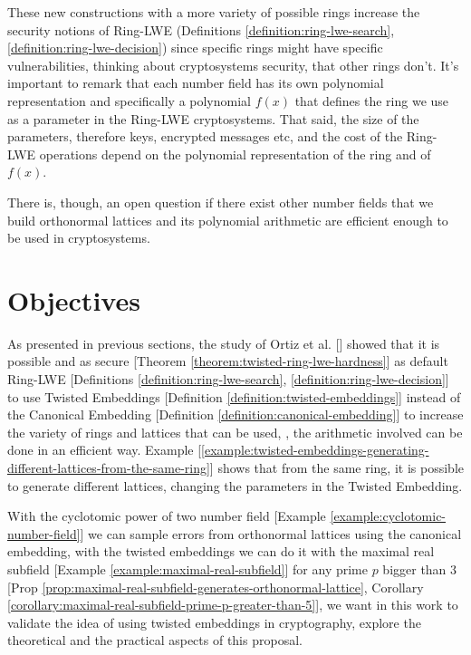 \documentclass[a4paper,12pt]{article}
\begin{document}
These new constructions with a more variety of possible rings increase the security notions of Ring-LWE (Definitions \ref{definition:ring-lwe-search}, \ref{definition:ring-lwe-decision}) since specific rings might have specific vulnerabilities, thinking about cryptosystems security, that other rings don't. It's important to remark that each number field has its own polynomial representation and specifically a polynomial \(f(x)\) that defines the ring we use as a parameter in the Ring-LWE cryptosystems. That said, the size of the parameters, therefore keys, encrypted messages etc, and the cost of the Ring-LWE operations depend on the polynomial representation of the ring and of \(f(x)\).

There is, though, an open question if there exist other number fields that we build orthonormal lattices and its polynomial arithmetic are efficient enough to be used in cryptosystems. 

\section{Objectives}
\label{sec:org98a2558}
As presented in previous sections, the study of Ortiz et al. [\cite{Ortiz2021}] showed that it is possible and as secure [Theorem \ref{theorem:twisted-ring-lwe-hardness}] as default Ring-LWE [Definitions \ref{definition:ring-lwe-search}, \ref{definition:ring-lwe-decision}] to use Twisted Embeddings [Definition \ref{definition:twisted-embeddings}] instead of the Canonical Embedding [Definition \ref{definition:canonical-embedding}] to increase the variety of rings and lattices that can be used, \ie, the arithmetic involved can be done in an efficient way. Example [\ref{example:twisted-embeddings-generating-different-lattices-from-the-same-ring}] shows that from the same ring, it is possible to generate different lattices, changing the parameters in the Twisted Embedding.

With the cyclotomic power of two number field [Example \ref{example:cyclotomic-number-field}] we can sample errors from orthonormal lattices using the canonical embedding, with the twisted embeddings we can do it with the maximal real subfield [Example \ref{example:maximal-real-subfield}] for any prime \(p\) bigger than \(3\) [Prop \ref{prop:maximal-real-subfield-generates-orthonormal-lattice}, Corollary \ref{corollary:maximal-real-subfield-prime-p-greater-than-5}], we want in this work to validate the idea of using twisted embeddings in cryptography, explore the theoretical and the practical aspects of this proposal.
\end{document}

